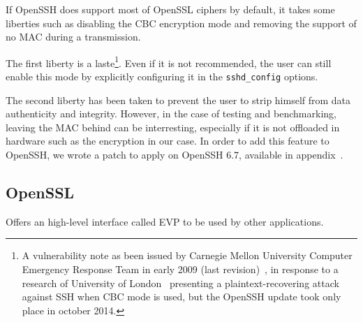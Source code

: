 If OpenSSH does support most of OpenSSL ciphers by default, it takes some liberties such as disabling the CBC encryption mode and removing the support of no MAC during a transmission.

\noindent The first liberty is a laste\footnote{A vulnerability note as been issued by Carnegie Mellon University Computer Emergency Response Team in early 2009 (last revision)~\cite{CERT2009}, in response to a research of University of London~\cite{Albrecht:2009} presenting a plaintext-recovering attack against SSH when CBC mode is used, but the OpenSSH update took only place in october 2014.}.
Even if it is not recommended, the user can still enable this mode by explicitly configuring it in the \texttt{sshd\_config} options.

\noindent The second liberty has been taken to prevent the user to strip himself from data authenticity and integrity.
However, in the case of testing and benchmarking, leaving the MAC behind can be interresting, especially if it is not offloaded in hardware such as the encryption in our case.
In order to add this feature to OpenSSH, we wrote a patch to apply on OpenSSH 6.7, available in appendix~\cite{chap:openssh-patch}.




\subsection{OpenSSL}

Offers an high-level interface called EVP to be used by other applications.


